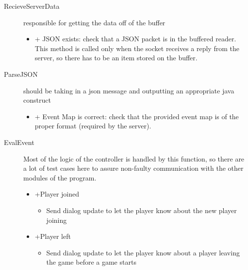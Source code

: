 \documentclass[12pt]{article}
\begin{document}
\begin{description}
	\item[RecieveServerData] responsible for getting the data off of the buffer
	\begin{itemize}
		\item + JSON exists: check that a JSON packet is in the buffered reader. This method is called only when the socket receives a reply from the server, so there has to be an item stored on the buffer.
	\end{itemize}
	\item[ParseJSON] should be taking in a json message and outputting an appropriate java construct
	\begin{itemize}
		\item + Event Map is correct: check that the provided event map is of the proper format (required by the server). 
	\end{itemize}
	
	\item[EvalEvent] Most of the logic of the controller is handled by this function, so there are a lot of test cases here to assure non-faulty communication with the other modules of the program. 
	\begin{itemize}
    \item +Player joined
    \begin{itemize}
    \item Send dialog update to let the player know about the new player joining
    \end{itemize}

		                
		\item +Player left
		\begin{itemize}
		    \item Send dialog update to let the player know about a player leaving the game before a game starts
		\end{itemize}
		                

\end{itemize}
\end{description}
\end{document}
